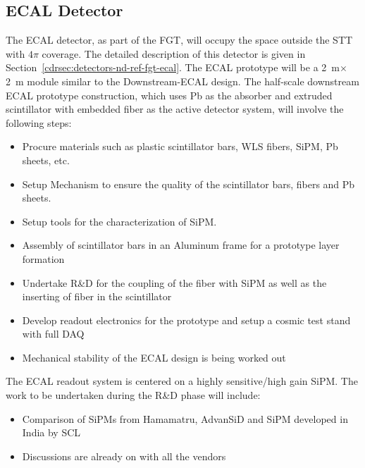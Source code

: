 \subsection{ECAL Detector} 


The ECAL detector, as part of the FGT, will occupy the space outside
the STT with $4\pi$ coverage.  The detailed description of this
detector is given in Section~\ref{cdrsec:detectors-nd-ref-fgt-ecal}.
The ECAL prototype will be a 2~m$\times$2~m module similar to the
Downstream-ECAL design.  The half-scale downstream ECAL prototype
construction, which uses Pb as the absorber and extruded scintillator
with embedded fiber as the active detector system, will involve the
following steps:
\begin{itemize} 
\item Procure materials such as plastic scintillator bars, WLS fibers,
  SiPM, Pb sheets, etc.
\item Setup Mechanism to ensure the quality of the scintillator bars,
  fibers and Pb sheets.
\item Setup tools for the characterization of SiPM.
\item Assembly of scintillator bars in an Aluminum frame for a
  prototype layer formation
\item Undertake R\&D for the coupling of the fiber with SiPM as well
  as the inserting of fiber in the scintillator
\item Develop readout electronics for the prototype and setup a cosmic
  test stand with full DAQ
\item Mechanical stability of the ECAL design is being worked out
\end{itemize} 

The ECAL readout system is centered on a highly sensitive/high gain SiPM. The work to be undertaken 
during the R\&D phase will include:
\begin{itemize}
\item Comparison of SiPMs from Hamamatru, AdvanSiD and SiPM developed in India by SCL
\item Discussions are already on with all the vendors
\end{itemize} 

